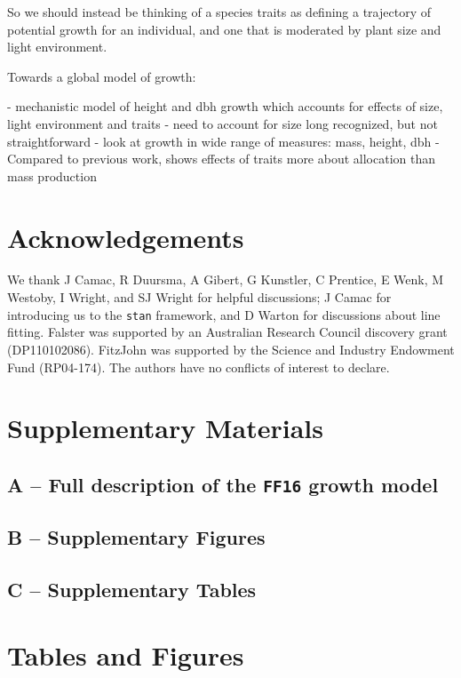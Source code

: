 \documentclass[a4paper,11pt]{article}
\begin{document}
So we should instead be thinking of a species traits as defining a trajectory of potential growth for an individual, and one that is moderated by plant size and light environment.

Towards a global model of growth:

- mechanistic model of height and dbh growth which accounts for effects of size, light environment and traits
- need to account for size long recognized, but not straightforward
- look at growth in wide range of measures: mass, height, dbh
- Compared to previous work, shows effects of traits more about
  allocation than mass production

\section{Acknowledgements}

We thank J Camac, R Duursma, A Gibert, G Kunstler, C Prentice, E Wenk, M Westoby, I Wright, and SJ Wright for helpful discussions; J Camac for introducing us to the \texttt{stan} framework, and D Warton for discussions about {\sma} line fitting. Falster was supported by an Australian Research Council discovery grant (DP110102086). FitzJohn was supported by the Science and Industry Endowment Fund (RP04-174). The authors have no conflicts of interest to declare.

\section{Supplementary Materials}

\subsection{A -- Full description of the \texttt{FF16} growth model}\label{sec:ff16}

\subsection{B -- Supplementary Figures}\label{sec:SM_figs}

\subsection{C -- Supplementary Tables}\label{sec:SM_tabs}


\newpage

\section{Tables and Figures}
\end{document}
